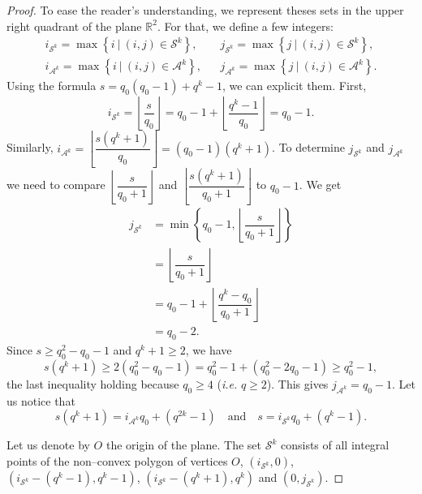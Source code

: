 \documentclass[a4paper]{article}
\newcommand{\calA}{\mathcal{A}}
\newcommand{\calS}{\mathcal{S}}
\newcommand{\R}{\mathbb{R}}
\newcommand{\set}[1]{\left\{#1\right\}}
\newcommand{\Floor}[1]{\left\lfloor #1 \right\rfloor}
\begin{document}
\begin{proof}
To ease the reader's understanding, we represent theses sets in the upper right quadrant of the plane $\R^2$. For that, we define a few integers:
\begin{align*}
	i_{\calS^k} = \max \set{ i \ | \ (i,j) \in \calS^k}, & & j_{\calS^k} = \max \set{ j \ | \ (i,j) \in \calS^k}, \\
	i_{\calA^k} = \max \set{ i \ | \ (i,j) \in \calA^k}, & & j_{\calA^k} = \max \set{ j \ | \ (i,j) \in \calA^k}.
\end{align*}
Using the formula $s=q_0(q_0-1)+q^k-1$, we can explicit them. First,
\[i_{\calS^k} = \Floor{\dfrac{s}{q_0}} = q_0-1 + \left\lfloor \dfrac{q^k-1}{q_0}\right\rfloor = q_0-1.\]
Similarly, $i_{\calA^k} = \left\lfloor \dfrac{s(q^k+1)}{q_0} \right\rfloor = (q_0-1)(q^k+1)$. To determine $j_{\calS^k}$ and $j_{\calA^k}$ we need to compare $\left\lfloor \dfrac{s}{q_0+1}\right\rfloor$ and $\left\lfloor \dfrac{s(q^k+1)}{q_0+1} \right\rfloor$ to $q_0-1$. We get
\[\begin{aligned}
    j_{\calS^k} &= \min \left\{ q_0-1, \left\lfloor \dfrac{s}{q_0+1} \right\rfloor \right\} \\
            &=  \left\lfloor \dfrac{s}{q_0+1} \right\rfloor \\
            &= q_0-1 +  \left\lfloor \dfrac{q^k-q_0}{q_0+1} \right\rfloor \\
            &= q_0-2.
\end{aligned}\]
Since $s \geq q_0^2 - q_0 -1$ and $q^k+1 \geq 2$, we have
\begin{equation} \label{desc}
	s(q^k+1) \geq 2(q_0^2-q_0-1) = q_0^2 - 1 + (q_0^2-2q_0-1) \geq q_0^2-1,
\end{equation}
the last inequality holding because $q_0 \geq 4$ (\emph{i.e.} $q \geq 2$). This gives $j_{\calA^k} = q_0-1$. Let us notice that
\begin{equation}\label{eq:s_iAk_jAk}
s(q^k+1) = i_{\calA^k}q_0+(q^{2k}-1) \quad \mathrm{and} \quad s=i_{\calS^k}q_0 + (q^k-1).
\end{equation}

Let us denote by $O$ the origin of the plane. The set $\calS^k$ consists of all integral points of the non--convex polygon of vertices $O$, $(i_{\calS^k},0)$, $(i_{\calS^k}-(q^k-1),q^k-1)$, $(i_{\calS^k}-(q^k+1),q^k)$ and $(0,j_{\calS^k})$.


\end{proof}
\end{document}
